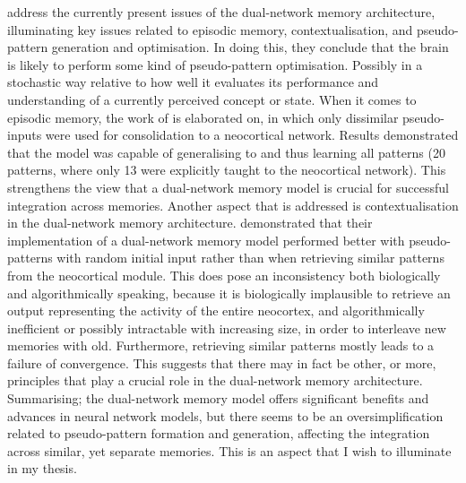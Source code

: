 \cite{French2001} address the currently present issues of the dual-network memory architecture, illuminating key issues related to episodic memory, contextualisation, and pseudo-pattern generation and optimisation. In doing this, they conclude that the brain is likely to perform some kind of pseudo-pattern optimisation. Possibly in a stochastic way relative to how well it evaluates its performance and understanding of a currently perceived concept or state. When it comes to episodic memory, the work of \cite{Ans2000} is elaborated on, in which only dissimilar pseudo-inputs were used for consolidation to a neocortical network. Results demonstrated that the model was capable of generalising to and thus learning all patterns (20 patterns, where only 13 were explicitly taught to the neocortical network). This strengthens the view that a dual-network memory model is crucial for successful integration across memories. Another aspect that is addressed is contextualisation in the dual-network memory architecture. \cite{Ans2000} demonstrated that their implementation of a dual-network memory model performed better with pseudo-patterns with random initial input rather than when retrieving similar patterns from the neocortical module. This does pose an inconsistency both biologically and algorithmically speaking, because it is biologically implausible to retrieve an output representing the activity of the entire neocortex, and algorithmically inefficient or possibly intractable with increasing size, in order to interleave new memories with old. Furthermore, retrieving similar patterns mostly leads to a failure of convergence. This suggests that there may in fact be other, or more, principles that play a crucial role in the dual-network memory architecture. Summarising; the dual-network memory model offers significant benefits and advances in neural network models, but there seems to be an oversimplification related to pseudo-pattern formation and generation, affecting the integration across similar, yet separate memories. This is an aspect that I wish to illuminate in my thesis.

